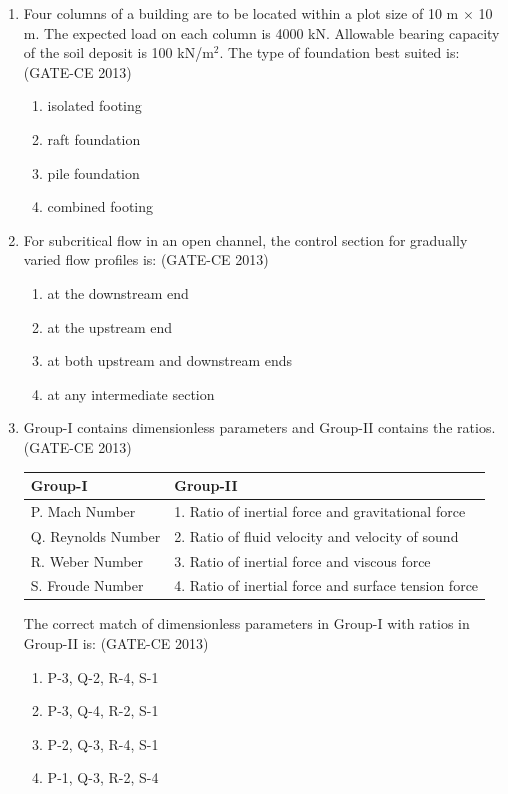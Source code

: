 \documentclass[journal,12pt,onecolumn]{article}
\theoremstyle{remark}
\begin{document}
\begin{enumerate}
    \item Four columns of a building are to be located within a plot size of 10 m $\times$ 10 m. The expected load on each column is 4000 kN. Allowable bearing capacity of the soil deposit is 100 kN/m$^2$. The type of foundation best suited is: (GATE-CE 2013)
    \begin{multicols}{2}
    \begin{enumerate}
        \item isolated footing 
        \item raft foundation 
        \item pile foundation 
        \item combined footing
    \end{enumerate}
    \end{multicols}
    
    \item For subcritical flow in an open channel, the control section for gradually varied flow profiles is: (GATE-CE 2013)
    \begin{enumerate}
        \item at the downstream end 
        \item at the upstream end 
        \item at both upstream and downstream ends 
        \item at any intermediate section
    \end{enumerate}
    
    \item Group-I contains dimensionless parameters and Group-II contains the ratios. (GATE-CE 2013)

    \begin{table}[H]
    \centering
    \begin{tabular}{|l|l|}
    \hline
    \textbf{Group-I} & \textbf{Group-II} \\
    \hline
    P. Mach Number & 1. Ratio of inertial force and gravitational force \\
    Q. Reynolds Number & 2. Ratio of fluid velocity and velocity of sound \\
    R. Weber Number & 3. Ratio of inertial force and viscous force \\
    S. Froude Number & 4. Ratio of inertial force and surface tension force \\
    \hline
    \end{tabular}
    \end{table}
    
    The correct match of dimensionless parameters in Group-I with ratios in Group-II is: (GATE-CE 2013)
    \begin{enumerate}
        \item P-3, Q-2, R-4, S-1 
        \item P-3, Q-4, R-2, S-1 
        \item P-2, Q-3, R-4, S-1 
        \item P-1, Q-3, R-2, S-4
    \end{enumerate}
    

\end{enumerate}
\end{document}
